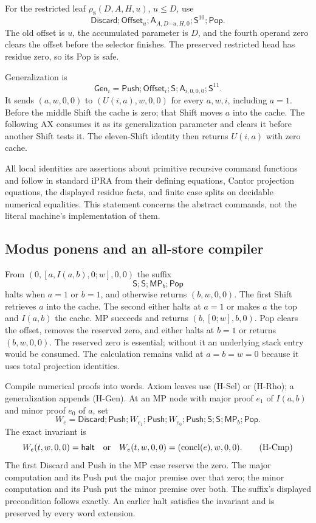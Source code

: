 For the restricted leaf $\rho_8(D,A,H,u)$, $u\le D$, use
\[
 \mathsf{Discard};\mathsf{Offset}_u;
 \mathsf A_{A,D\mathbin{\dot{-}}u,H,0};
                      \mathsf S^{10};\mathsf{Pop}.          \tag{H-Rho}
\]
The old offset is $u$, the accumulated parameter is $D$, and the
fourth operand zero clears the offset before the selector finishes.
The preserved restricted head has residue zero, so its Pop is safe.

Generalization is
\[
 \mathsf{Gen}_i=\mathsf{Push};\mathsf{Offset}_i;\mathsf S;
                 \mathsf A_{i,0,0,0};\mathsf S^{11}.         \tag{H-Gen}
\]
It sends $(a,w,0,0)$ to $(U(i,a),w,0,0)$ for every $a,w,i$,
including $a=1$. Before the middle Shift the cache is zero; that
Shift moves $a$ into the cache. The following AX consumes it as its
generalization parameter and clears it before another Shift tests it.
The eleven-Shift identity then returns $U(i,a)$ with zero cache.

All local identities are assertions about primitive recursive command
functions and follow in standard iPRA from their defining equations,
Cantor projection equations, the displayed residue facts, and finite
case splits on decidable numerical equalities. This statement concerns
the abstract commands, not the literal machine's implementation of them.

\subsection{Modus ponens and an all-store compiler}

From $(0,[a,I(a,b),0;w],0,0)$ the suffix
\[
              \mathsf S;\mathsf S;\mathsf{MP}_b;\mathsf{Pop}       \tag{H-MPs}
\]
halts when $a=1$ or $b=1$, and otherwise returns $(b,w,0,0)$.
The first Shift retrieves $a$ into the cache. The second either
halts at $a=1$ or makes $a$ the top and $I(a,b)$ the cache.
MP succeeds and returns $(b,[0;w],b,0)$. Pop clears the offset,
removes the reserved zero, and either halts at $b=1$ or returns
$(b,w,0,0)$. The reserved zero is essential; without it an
underlying stack entry would be consumed. The calculation remains
valid at $a=b=w=0$ because it uses total projection identities.

Compile numerical proofs into words. Axiom leaves use (H-Sel) or
(H-Rho); a generalization appends (H-Gen). At an MP node with major
proof $e_1$ of $I(a,b)$ and minor proof $e_0$ of $a$, set
\[
 W_e=\mathsf{Discard};\mathsf{Push};W_{e_1};\mathsf{Push};
        W_{e_0};\mathsf{Push};\mathsf S;\mathsf S;
                                  \mathsf{MP}_b;\mathsf{Pop}.
\]
The exact invariant is
\[
 W_e(t,w,0,0)=\mathsf{halt}
 \quad\hbox{or}\quad
 W_e(t,w,0,0)=(\operatorname{concl}(e),w,0,0).             \tag{H-Cmp}
\]
The first Discard and Push in the MP case reserve the zero. The
major computation and its Push put the major premise over that
zero; the minor computation and its Push put the minor premise
over both. The suffix's displayed precondition follows exactly.
An earlier halt satisfies the invariant and is preserved by
every word extension.

